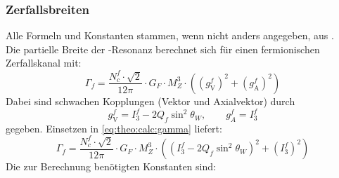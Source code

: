 \subsubsection*{Zerfallsbreiten}
Alle Formeln und Konstanten stammen, wenn nicht anders angegeben, aus \cite{manualmuc}. \\
Die partielle Breite der \Z-Resonanz berechnet sich für einen fermionischen Zerfallskanal mit:
\begin{equation}
    \label{eq:theo:calc:gamma}
    \Gamma_f = \frac{N_c^f \cdot \sqrt{2}}{12 \pi} \cdot G_F \cdot M_Z^3 \cdot \left( \left( g_\text{V}^f \right)^2 + \left( g_\text{A}^f \right)^2 \right)
\end{equation}
Dabei sind schwachen Kopplungen (Vektor und Axialvektor) durch
\begin{equation}
    g_\text{V}^f = I_3^f - 2 Q_f \sin^2 \theta_W, \qquad g_A^f = I_3^f
\end{equation}
gegeben. Einsetzen in \autoref{eq:theo:calc:gamma} liefert:
\begin{equation}
    \Gamma_f = \frac{N_c^f \cdot \sqrt{2}}{12 \pi} \cdot G_F \cdot M_Z^3 \cdot \left( \left( I_3^f - 2 Q_f \sin^2 \theta_W \right)^2 + \left( I_3^f \right)^2 \right)
\end{equation}
Die zur Berechnung benötigten Konstanten sind:
